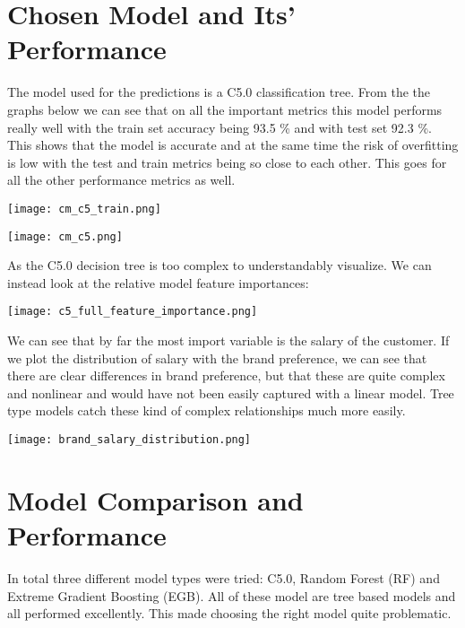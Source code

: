 \documentclass[12pt,a4paper,leqno]{report}
\theoremstyle{plain}
\theoremstyle{definition}
\theoremstyle{remark}
\begin{document}
\section{Chosen Model and Its' Performance}

The model used for the predictions is a C5.0 classification tree. From the the graphs below we can see that
on all the important metrics this model performs really well with the train set accuracy being 93.5 \% and
with test set 92.3 \%. This shows that the model is accurate and at the same time
the risk of overfitting is low with the
test and train metrics being so close to each other. This goes for all the other performance metrics as well.

\bigskip
{
    \centering
    \texttt{[image: cm\_c5\_train.png]}
    \par
}
\bigskip

\bigskip
{
    \centering
    \texttt{[image: cm\_c5.png]}
    \par
}
\bigskip

As the C5.0 decision tree is too complex to understandably visualize. We can instead look at the
relative model feature importances:

\bigskip
{
    \centering
    \texttt{[image: c5\_full\_feature\_importance.png]}
    \par
}
\bigskip

We can see that by far the most import variable is the salary of the customer. If we plot the distribution
of salary with the brand preference, we can see that there are clear differences in brand preference, but that these
are quite complex and nonlinear and would have not been easily captured with a linear model. Tree
type models catch these kind of complex relationships much more easily.

\bigskip
{
    \centering
    \texttt{[image: brand\_salary\_distribution.png]}
    \par
}
\bigskip


\section{Model Comparison and Performance}

In total three different model types were tried: C5.0, Random Forest (RF) and Extreme Gradient Boosting (EGB).
All of these model are tree based models and all performed excellently. This made choosing the right model
quite problematic.
\end{document}
